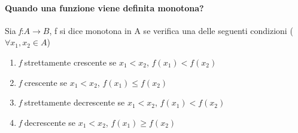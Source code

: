 \paragraph{Quando una funzione viene definita monotona?}
Sia \textit{f}:$A\to B$, f si dice monotona in A se verifica una delle seguenti
condizioni ($\forall x_1,x_2\in A$)
\begin{enumerate}
	\item \textit{f} strettamente crescente se $x_1<x_2$, $f(x_1)<f(x_2)$
	\item \textit{f} crescente se $x_1<x_2$, $f(x_1)\leq f(x_2)$
	\item \textit{f} strettamente decrescente se $x_1<x_2$, $f(x_1)<f(x_2)$
	\item \textit{f} decrescente se $x_1<x_2$, $f(x_1)\geq f(x_2)$
\end{enumerate}
